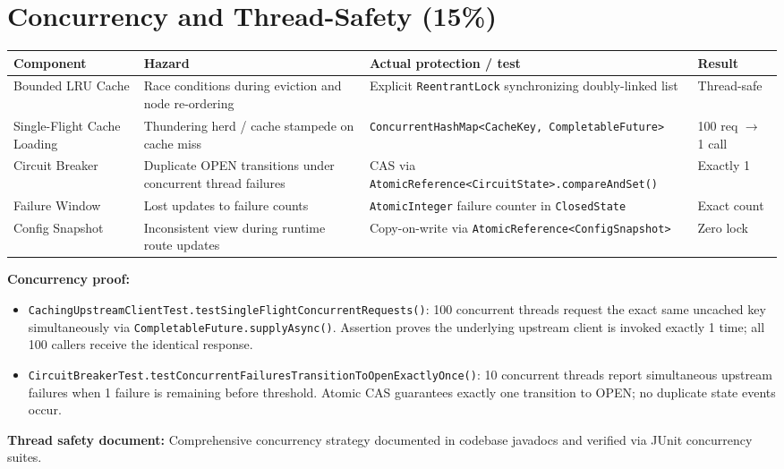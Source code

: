 \documentclass[12pt,a4paper]{article}
\newcommand{\cls}[1]{\nolinkurl{#1}}
\begin{document}
\section{Concurrency and Thread-Safety (15\%)}\label{sec:concurrency}
\begin{longtable}{L{3cm} L{4cm} L{4.3cm} L{1.5cm}}\toprule
\textbf{Component} & \textbf{Hazard} & \textbf{Actual protection / test} & \textbf{Result}\\\midrule\endhead
Bounded LRU Cache & Race conditions during eviction and node re-ordering & Explicit \cls{ReentrantLock} synchronizing doubly-linked list & Thread-safe\\
Single-Flight Cache Loading & Thundering herd / cache stampede on cache miss & \cls{ConcurrentHashMap<CacheKey, CompletableFuture>} & 100 req $\rightarrow$ 1 call\\
Circuit Breaker & Duplicate OPEN transitions under concurrent thread failures & CAS via \cls{AtomicReference<CircuitState>.compareAndSet()} & Exactly 1\\
Failure Window & Lost updates to failure counts & \cls{AtomicInteger} failure counter in \cls{ClosedState} & Exact count\\
Config Snapshot & Inconsistent view during runtime route updates & Copy-on-write via \cls{AtomicReference<ConfigSnapshot>} & Zero lock\\\bottomrule\end{longtable}
\textbf{Concurrency proof:}
\begin{itemize}[leftmargin=*]
\item \cls{CachingUpstreamClientTest.testSingleFlightConcurrentRequests()}: 100 concurrent threads request the exact same uncached key simultaneously via \cls{CompletableFuture.supplyAsync()}. Assertion proves the underlying upstream client is invoked exactly 1 time; all 100 callers receive the identical response.
\item \cls{CircuitBreakerTest.testConcurrentFailuresTransitionToOpenExactlyOnce()}: 10 concurrent threads report simultaneous upstream failures when 1 failure is remaining before threshold. Atomic CAS guarantees exactly one transition to OPEN; no duplicate state events occur.
\end{itemize}
\textbf{Thread safety document:} Comprehensive concurrency strategy documented in codebase javadocs and verified via JUnit concurrency suites.
\end{document}

